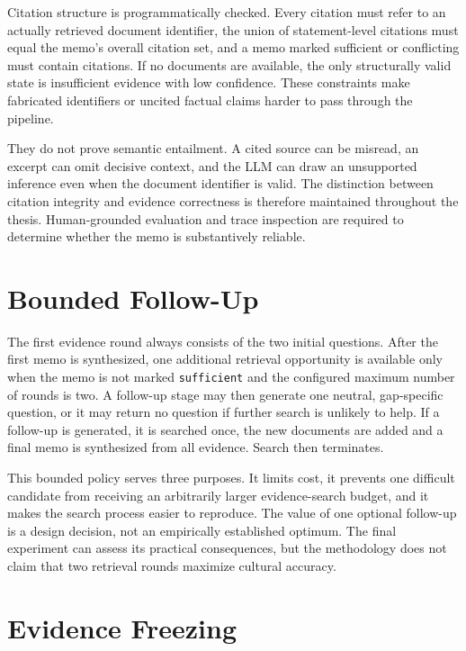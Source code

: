 Citation structure is programmatically checked. Every citation must refer to an actually retrieved document identifier, the union of statement-level citations must equal the memo's overall citation set, and a memo marked sufficient or conflicting must contain citations. If no documents are available, the only structurally valid state is insufficient evidence with low confidence. These constraints make fabricated identifiers or uncited factual claims harder to pass through the pipeline.

They do not prove semantic entailment. A cited source can be misread, an excerpt can omit decisive context, and the LLM can draw an unsupported inference even when the document identifier is valid. The distinction between citation integrity and evidence correctness is therefore maintained throughout the thesis. Human-grounded evaluation and trace inspection are required to determine whether the memo is substantively reliable.

\section{Bounded Follow-Up}
\label{sec:bounded-followup}

The first evidence round always consists of the two initial questions. After the first memo is synthesized, one additional retrieval opportunity is available only when the memo is not marked \texttt{sufficient} and the configured maximum number of rounds is two. A follow-up stage may then generate one neutral, gap-specific question, or it may return no question if further search is unlikely to help. If a follow-up is generated, it is searched once, the new documents are added and a final memo is synthesized from all evidence. Search then terminates.

This bounded policy serves three purposes. It limits cost, it prevents one difficult candidate from receiving an arbitrarily larger evidence-search budget, and it makes the search process easier to reproduce. The value of one optional follow-up is a design decision, not an empirically established optimum. The final experiment can assess its practical consequences, but the methodology does not claim that two retrieval rounds maximize cultural accuracy.

\section{Evidence Freezing}
\label{sec:evidence-freezing}

